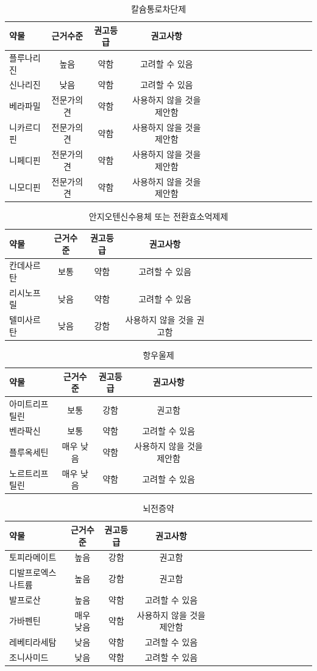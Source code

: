 \documentclass[]{book}
\begin{document}
\begin{longtable}{lccclccclccclccc}
\caption{\label{tab:unnamed-chunk-3}칼슘통로차단제}\\
\toprule
약물 & 근거수준 & 권고등급 & 권고사항\\
\midrule
플루나리진 & 높음 & 약함 & 고려할 수 있음\\
신나리진 & 낮음 & 약함 & 고려할 수 있음\\
베라파밀 & 전문가의견 & 약함 & 사용하지 않을 것을 제안함\\
니카르디핀 & 전문가의견 & 약함 & 사용하지 않을 것을 제안함\\
니페디핀 & 전문가의견 & 약함 & 사용하지 않을 것을 제안함\\
\addlinespace
니모디핀 & 전문가의견 & 약함 & 사용하지 않을 것을 제안함\\
\bottomrule
\end{longtable}

\begin{longtable}{lccclccclccclccc}
\caption{\label{tab:unnamed-chunk-4}안지오텐신수용체 또는 전환효소억제제}\\
\toprule
약물 & 근거수준 & 권고등급 & 권고사항\\
\midrule
칸데사르탄 & 보통 & 약함 & 고려할 수 있음\\
리시노프릴 & 낮음 & 약함 & 고려할 수 있음\\
텔미사르탄 & 낮음 & 강함 & 사용하지 않을 것을 권고함\\
\bottomrule
\end{longtable}

\begin{longtable}{lccclccclccclccc}
\caption{\label{tab:unnamed-chunk-5}항우울제}\\
\toprule
약물 & 근거수준 & 권고등급 & 권고사항\\
\midrule
아미트리프틸린 & 보통 & 강함 & 권고함\\
벤라팍신 & 보통 & 약함 & 고려할 수 있음\\
플루옥세틴 & 매우 낮음 & 약함 & 사용하지 않을 것을 제안함\\
노르트리프틸린 & 매우 낮음 & 약함 & 고려할 수 있음\\
\bottomrule
\end{longtable}

\begin{longtable}{lccclccclccclccc}
\caption{\label{tab:unnamed-chunk-6}뇌전증약}\\
\toprule
약물 & 근거수준 & 권고등급 & 권고사항\\
\midrule
토피라메이트 & 높음 & 강함 & 권고함\\
디발프로엑스나트륨 & 높음 & 강함 & 권고함\\
발프로산 & 높음 & 약함 & 고려할 수 있음\\
가바펜틴 & 매우 낮음 & 약함 & 사용하지 않을 것을 제안함\\
레베티라세탐 & 낮음 & 약함 & 고려할 수 있음\\
\addlinespace
조니사미드 & 낮음 & 약함 & 고려할 수 있음\\
\bottomrule
\end{longtable}
\end{document}
